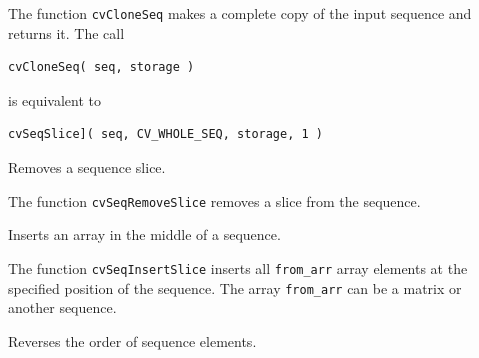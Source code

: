 The function \texttt{cvCloneSeq} makes a complete copy of the input sequence and returns it.
\ifC
The call

\begin{lstlisting}
cvCloneSeq( seq, storage )
\end{lstlisting}

is equivalent to

\begin{lstlisting}
cvSeqSlice]( seq, CV_WHOLE_SEQ, storage, 1 )
\end{lstlisting}
\fi

\label{SeqRemoveSlice}

Removes a sequence slice.


\begin{description}
\end{description}


The function \texttt{cvSeqRemoveSlice} removes a slice from the sequence.

\ifC
{}\label{SeqInsertSlice}

Inserts an array in the middle of a sequence.


\begin{description}
\end{description}


The function \texttt{cvSeqInsertSlice} inserts all \texttt{from\_arr}
array elements at the specified position of the sequence. The array
\texttt{from\_arr} can be a matrix or another sequence.

\fi

\label{SeqInvert}

Reverses the order of sequence elements.


